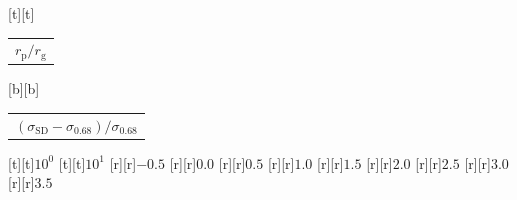 %    
%
%
\begin{psfrags}%
\psfragscanon%
%
[t][t]{\color[rgb]{0,0,0}\setlength{\tabcolsep}{0pt}\begin{tabular}{c}{\Large$r_\mathrm{p}/r_\mathrm{g}$}\end{tabular}}%
[b][b]{\color[rgb]{0,0,0}\setlength{\tabcolsep}{0pt}\begin{tabular}{c}{\Large$(\sigma_\mathrm{SD}-\sigma_{0.68})/\sigma_{0.68}$}\end{tabular}}%
%
[t][t]{$10^{0}$}%
[t][t]{$10^{1}$}%
%
[r][r]{$-0.5$}%
[r][r]{$0.0$}%
[r][r]{$0.5$}%
[r][r]{$1.0$}%
[r][r]{$1.5$}%
[r][r]{$2.0$}%
[r][r]{$2.5$}%
[r][r]{$3.0$}%
[r][r]{$3.5$}%
%
%
\end{psfrags}%
%
